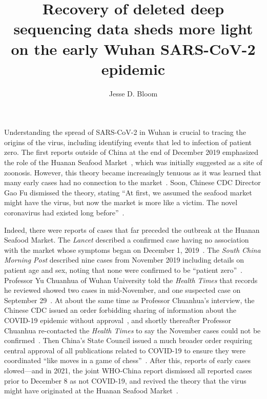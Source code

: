 \documentclass[9pt,twocolumn,twoside]{gsajnl_modified}
\title{Recovery of deleted deep sequencing data sheds more light on the early Wuhan SARS-CoV-2 epidemic}
\author[]{\Large Jesse D. Bloom}
\affil[]{Fred Hutchinson Cancer Research Center}
\affil[]{Howard Hughes Medical Institute}
\affil[]{Seattle, WA, USA}
\begin{document}
\maketitle
\thispagestyle{firststyle}
\firstpagefootnote

\vspace{-33pt}%

\lettrine[lines=2]{\color{color2}U}{}nderstanding the spread of SARS-CoV-2 in Wuhan is crucial to tracing the origins of the virus, including identifying events that led to infection of patient zero.
The first reports outside of China at the end of December 2019 emphasized the role of the Huanan Seafood Market~\citep{ProMED2109}, which was initially suggested as a site of zoonosis.
However, this theory became increasingly tenuous as it was learned that many early cases had no connection to the market~\citep{huang2020clinical, chen2020epidemiological}.
Soon, Chinese CDC Director Gao Fu dismissed the theory, stating ``At first, we assumed the seafood market might have the virus, but now the market is more like a victim.
The novel coronavirus had existed long before''~\citep{GlobalTimes2020}.

Indeed, there were reports of cases that far preceded the outbreak at the Huanan Seafood Market.
The \textit{Lancet} described a confirmed case having no association with the market whose symptoms began on December 1, 2019~\citep{huang2020clinical}.
The \textit{South China Morning Post} described nine cases from November 2019 including details on patient age and sex, noting that none were confirmed to be ``patient zero''~\citep{ma2020SCMP}.
Professor Yu Chuanhua of Wuhan University told the \textit{Health Times} that records he reviewed showed two cases in mid-November, and one suspected case on September 29~\citep{healthtimes2020}.
At about the same time as Professor Chuanhua's interview, the Chinese CDC issued an order forbidding sharing of information about the COVID-19 epidemic without approval~\citep{chinacdc2020}, and shortly thereafter Professor Chuanhua re-contacted the \textit{Health Times} to say the November cases could not be confirmed~\citep{healthtimes2020}.
Then China's State Council issued a much broader order requiring central approval of all publications related to COVID-19 to ensure they were coordinated ``like moves in a game of chess''~\citep{Kang2020}.
After this, reports of early cases slowed---and in 2021, the joint WHO-China report dismissed all reported cases prior to December 8 as not COVID-19, and revived the theory that the virus might have originated at the Huanan Seafood Market~\citep{WHO2021origins}.
\end{document}
